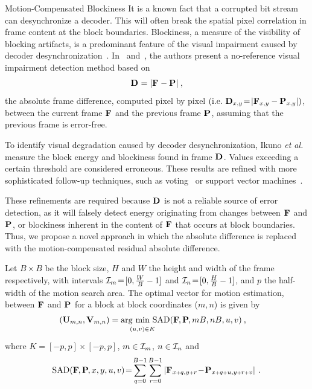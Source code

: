 \documentclass{article}
\begin{document}
\begin{section}{Motion-Compensated Blockiness}
\label{section-motion-compensated-blockiness} %
It is a known fact that a corrupted bit stream can desynchronize a decoder. 
This will often break the spatial pixel correlation in frame content at the 
block boundaries. Blockiness, a measure of the visibility of blocking 
artifacts, 
is a predominant feature of the visual impairment caused by decoder
desynchronization~\cite{Superiori2007}. In~\cite{Superiori2007} 
and~\cite{Ikuno2007}, the authors present a no-reference
visual impairment detection method based on 
\begin{equation*}
\label{eq-FrameSub}
\mathbf{D}_{} = | \mathbf{F}_{} - \mathbf{P}_{} |\:,
\end{equation*}
the absolute frame difference, computed pixel by pixel 
\mbox{$\left(\textrm{i.e.~} \mathbf{D}_{x,y}\!=\!\left| \mathbf{F}_{x,y} - \mathbf{P}_{x,y} 
\right|\right)$}, 
between the current frame $\mathbf{F}_{}$ and the previous frame $\mathbf{P}_{}$, 
assuming that the previous frame is error-free.

To identify visual degradation caused by decoder desynchronization, Ikuno
\textit{et al.}~\cite{Ikuno2007} measure the block energy and blockiness found 
in frame $\mathbf{D}_{}$. Values exceeding a certain threshold are considered
erroneous. These results are refined with more sophisticated follow-up
techniques, such as voting~\cite{Superiori2007,Ikuno2007} or support vector
machines~\cite{Farrugia2008}.

These refinements are required because $\mathbf{D}_{}$ is not a reliable source of
error detection, as it will falsely detect energy originating from changes 
between $\mathbf{F}_{}$ and $\mathbf{P}_{}$, or blockiness inherent in the content of 
$\mathbf{F}_{}$ that occurs at block boundaries. Thus, we propose a novel approach in
which the absolute difference is replaced with the motion-compensated
residual absolute difference.

Let $B\times{}B$ be the block size, $H$ and $W$ the height and width of the
frame respectively, with intervals \mbox{$\mathcal{I}_{m}\!=\![0,\frac{W}{B}-1]$}
and \mbox{$\mathcal{I}_{n}\!=\![0,\frac{H}{B}-1]$}, and $p$ the half-width of the
motion search area. The optimal vector for motion estimation, between
$\mathbf{F}_{}$ and $\mathbf{P}_{}$ for a block at block coordinates ($m,n$) is given by
\begin{multline}
\label{eq-Vectors}
\hspace{-1em}(\mathbf{U}_{m,n}, \mathbf{V}_{m,n}) = \arg\hspace{-5pt}\min_{\vphantom{\big|}(u,v) \in K} \hspace{-5pt}\ltSAD{\ltF{\!}, 
\ltP{\!}, mB, nB, u, v} \:,
\end{multline} where $K = [-p,p] \times [-p, p]$,  $m \in \mathcal{I}_{m}$, $n \in
\mathcal{I}_{n}$ and
\begin{equation*}
\textrm{SAD}(\mathbf{F}_{\!}, \mathbf{P}_{\!}, x,y,u,v)\!=\!\sum_{q=0}^{B-1}\sum_{r=0}^{B-1} \left| 
\mathbf{F}_{x{\scriptscriptstyle +}q,y{\scriptscriptstyle +}r}\!-\!\mathbf{P}_{x{\scriptscriptstyle +}q{\scriptscriptstyle +}u,y{\scriptscriptstyle +}r{\scriptscriptstyle +}v} \right|\:.
\end{equation*}


\end{section}
\end{document}
